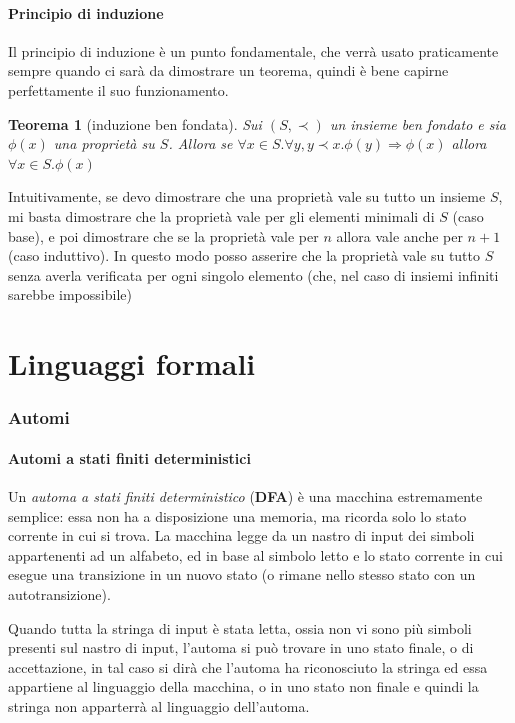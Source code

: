 \documentclass[a4paper,titlepage]{article}
\newtheorem{theorem}{Teorema}[section]
\theoremstyle{definition}
\begin{document}
\subsection{Principio di induzione}
Il principio di induzione è un punto fondamentale, che verrà usato praticamente sempre quando ci sarà da dimostrare un teorema, quindi è bene capirne perfettamente il suo funzionamento. 

\begin{theorem}[induzione ben fondata]
	Sui $(S, \prec)$ un insieme ben fondato e sia $\phi(x)$ una proprietà su $S$. Allora se $\forall x\in S.\forall y,y\prec x.\phi(y)\Rightarrow\phi(x)$ allora $\forall x\in S.\phi(x)$
\end{theorem}

Intuitivamente, se devo dimostrare che una proprietà vale su tutto un insieme $S$, mi basta dimostrare che la proprietà vale per gli elementi minimali di $S$ (caso base), e poi dimostrare che se la proprietà vale per $n$ allora vale anche per $n+1$ (caso induttivo). In questo modo posso asserire che la proprietà vale su tutto $S$ senza averla verificata per ogni singolo elemento (che, nel caso di insiemi infiniti sarebbe impossibile)

\part{Linguaggi formali}
\section{Automi}
\subsection{Automi a stati finiti deterministici}
Un \textit{automa a stati finiti deterministico} (\textbf{DFA}) è una macchina estremamente semplice: essa non ha a disposizione una memoria, ma ricorda solo lo stato corrente in cui si trova. La macchina legge da un nastro di input dei simboli appartenenti ad un alfabeto, ed in base al simbolo letto e lo stato corrente in cui esegue una transizione in un nuovo stato (o rimane nello stesso stato con un autotransizione). 

Quando tutta la stringa di input è stata letta, ossia non vi sono più simboli presenti sul nastro di input, l'automa si può trovare in uno stato finale, o di accettazione, in tal caso si dirà che l'automa ha riconosciuto la stringa ed essa appartiene al linguaggio della macchina, o in uno stato non finale e quindi la stringa non apparterrà al linguaggio dell'automa. 
\end{document}
